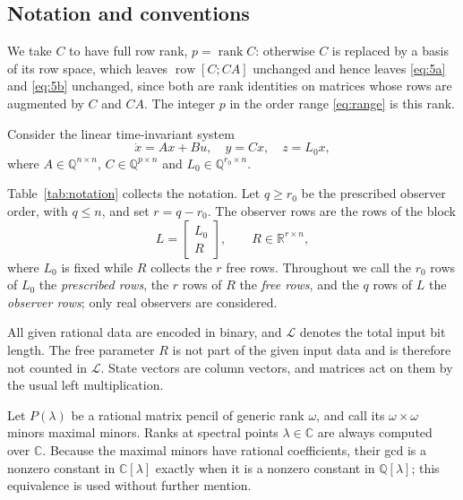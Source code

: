 ﻿\documentclass[journal]{IEEEtran}
\theoremstyle{plainn}
\theoremstyle{remark}
\begin{document}
\subsection{Notation and conventions}\label{sec:notation}

We take $C$ to have full row rank, $p=\operatorname{rank}C$: otherwise $C$ is replaced by a basis of
its row space, which leaves $\operatorname{row}[C;CA]$ unchanged and hence leaves \eqref{eq:5a} and
\eqref{eq:5b} unchanged, since both are rank identities on matrices whose rows are augmented by $C$ and
$CA$. The integer $p$ in the order range \eqref{eq:range} is this rank.

Consider the linear time-invariant system
\begin{equation*}
\dot{x}=Ax+Bu,\quad y=Cx,\quad z=L_0x,
\end{equation*}
where $A\in\mathbb Q^{n\times n}$, $C\in\mathbb Q^{p\times n}$ and
$L_0\in\mathbb Q^{r_0\times n}$.

Table~\ref{tab:notation} collects the notation. Let $q\ge r_0$ be the prescribed observer order,
with $q\le n$, and set $r=q-r_0$. The
observer rows are the rows of the block
\begin{equation*}
L=\begin{bmatrix}L_0\\R\end{bmatrix},\qquad R\in\mathbb R^{r\times n},
\end{equation*}
where $L_0$ is fixed while $R$ collects the $r$ free rows. Throughout we call the $r_0$ rows of
$L_0$ the \emph{prescribed rows}, the $r$ rows of $R$ the \emph{free rows}, and the $q$ rows of $L$
the \emph{observer rows}; only real observers are considered.

All given rational data are encoded in binary, and $\mathcal L$ denotes the total input
bit length. The free parameter $R$ is not part of the given input data and is therefore
not counted in $\mathcal L$. State vectors are column vectors, and matrices act on them by
the usual left multiplication.

Let $P(\lambda)$ be a rational matrix pencil of generic rank $\omega$, and call its
$\omega\times\omega$ minors maximal minors. Ranks at spectral points $\lambda\in\mathbb C$
are always computed over $\mathbb C$. Because the maximal minors have rational
coefficients, their gcd is a nonzero constant in $\mathbb C[\lambda]$ exactly when it is a
nonzero constant in $\mathbb Q[\lambda]$; this equivalence is used without further
mention.
\end{document}
